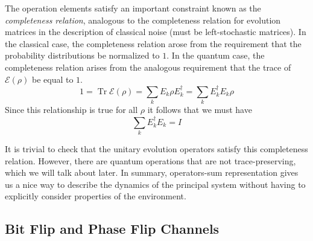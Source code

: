 \documentclass{article}
\DeclareMathOperator{\Tr}{Tr}
\begin{document}
    \begin{lemma}
      The operation elements satisfy an important constraint known as the \textit{completeness relation}, analogous to the completeness relation for evolution matrices in the description of classical noise (must be left-stochastic matrices). In the classical case, the completeness relation arose from the requirement that the probability distributions be normalized to $1$. In the quantum case, the completeness relation arises from the analogous requirement that the trace of $\mathcal{E}(\rho)$ be equal to $1$. 
      \begin{equation}
        1 = \Tr \mathcal{E}(\rho) = \sum_k E_k \rho E_k^\dagger = \sum_k E_k^\dagger E_k \rho 
      \end{equation}
      Since this relationship is true for all $\rho$ it follows that we must have 
      \begin{equation}
        \sum_k E_k^\dagger E_k = I
      \end{equation}
    \end{lemma}

    It is trivial to check that the unitary evolution operators satisfy this completeness relation. However, there are quantum operations that are not trace-preserving, which we will talk about later.  In summary, operators-sum representation gives us a nice way to describe the dynamics of the principal system without having to explicitly consider properties of the environment. 

    \begin{example}[Neilsen Ex 8.4]
      
    \end{example}

    \begin{example}[Neilsen Ex 8.5]
      
    \end{example}

  \subsection{Bit Flip and Phase Flip Channels}
\end{document}
